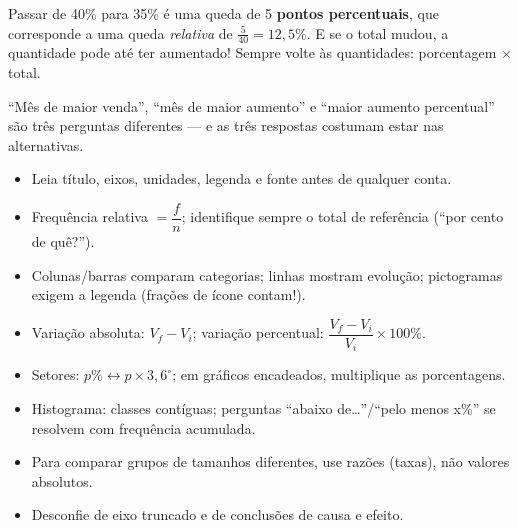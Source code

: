 \begin{atencao}
Passar de 40\% para 35\% é uma queda de 5 \textbf{pontos percentuais}, que
corresponde a uma queda \emph{relativa} de $\frac{5}{40}=12{,}5\%$. E se o total
mudou, a quantidade pode até ter aumentado! Sempre volte às quantidades:
porcentagem $\times$ total.
\end{atencao}

\begin{atencao}
“Mês de maior venda”, “mês de maior aumento” e “maior aumento percentual” são
três perguntas diferentes — e as três respostas costumam estar nas alternativas.
\end{atencao}

\begin{resumo}
\begin{itemize}[leftmargin=1.2em,itemsep=2pt]
\item Leia título, eixos, unidades, legenda e fonte antes de qualquer conta.
\item Frequência relativa $=\dfrac{f}{n}$; identifique sempre o total de referência (“por cento de quê?”).
\item Colunas/barras comparam categorias; linhas mostram evolução; pictogramas exigem a legenda (frações de ícone contam!).
\item Variação absoluta: $V_f-V_i$; variação percentual: $\dfrac{V_f-V_i}{V_i}\times100\%$.
\item Setores: $p\%\leftrightarrow p\times3{,}6^\circ$; em gráficos encadeados, multiplique as porcentagens.
\item Histograma: classes contíguas; perguntas “abaixo de…”/“pelo menos x\%” se resolvem com frequência acumulada.
\item Para comparar grupos de tamanhos diferentes, use razões (taxas), não valores absolutos.
\item Desconfie de eixo truncado e de conclusões de causa e efeito.
\end{itemize}
\end{resumo}

\secaoenem


